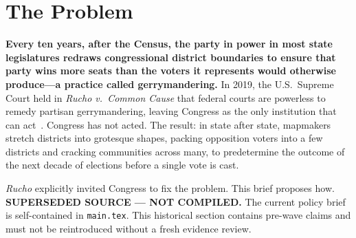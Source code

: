 
\section{The Problem}

\noindent\textbf{Every ten years, after the Census, the party in power in most
state legislatures redraws congressional district boundaries to ensure
that party wins more seats than the voters it represents would otherwise
produce---a practice called gerrymandering.}
In 2019, the U.S.\ Supreme Court held in \textit{Rucho v.\ Common Cause}
that federal courts are powerless to remedy partisan gerrymandering,
leaving Congress as the only institution that can act~\cite{rucho2019}.
Congress has not acted.
The result: in state after state, mapmakers stretch districts into
grotesque shapes, packing opposition voters into a few districts and
cracking communities across many, to predetermine the outcome of
the next decade of elections before a single vote is cast.

\medskip
\noindent\textit{Rucho} explicitly invited Congress to fix the problem.
This brief proposes how.
\noindent\textbf{SUPERSEDED SOURCE --- NOT COMPILED.} The current policy brief
is self-contained in \texttt{main.tex}. This historical section contains
pre-wave claims and must not be reintroduced without a fresh evidence review.
